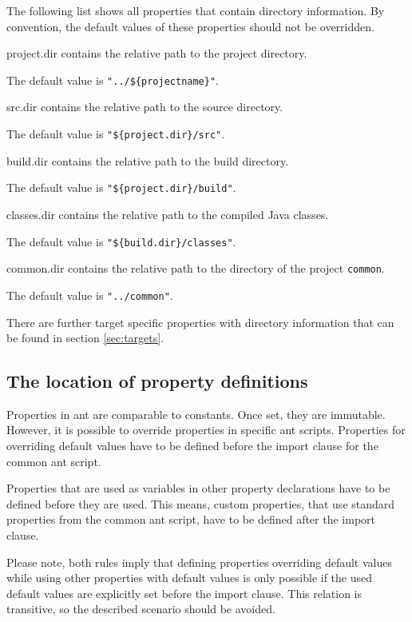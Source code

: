 \documentclass[a4paper,twoside,11pt,bibtotoc]{article}
\begin{document}
The following list shows all properties that contain directory information.
By convention, the default values of these properties should not be overridden.
\begin{description*}
	\item[project.dir] contains the relative path to the project directory.\par The default value is \texttt{"../\$\{projectname\}"}.
	\item[src.dir] contains the relative path to the source directory.\par The default value is \texttt{"\$\{project.dir\}/src"}.
	\item[build.dir] contains the relative path to the build directory.\par The default value is \texttt{"\$\{project.dir\}/build"}.
	\item[classes.dir] contains the relative path to the compiled Java classes.\par The default value is \texttt{"\$\{build.dir\}/classes"}.
	\item[common.dir] contains the relative path to the directory of the project \texttt{common}.\par The default value is \texttt{"../common"}.
\end{description*}
There are further target specific properties with directory information that can be found in section \ref{sec:targets}.

\subsection{The location of property definitions}
Properties in ant are comparable to constants.
Once set, they are immutable.
However, it is possible to override properties in specific ant scripts.
Properties for overriding default values have to be defined before the import clause for the common ant script.

Properties that are used as variables in other property declarations have to be defined before they are used.
This means, custom properties, that use standard properties from the common ant script, have to be defined after the import clause.

Please note, both rules imply that defining properties overriding default values while using other properties with default values is only possible if the used default values are explicitly set before the import clause.
This relation is transitive, so the described scenario should be avoided.
\end{document}
